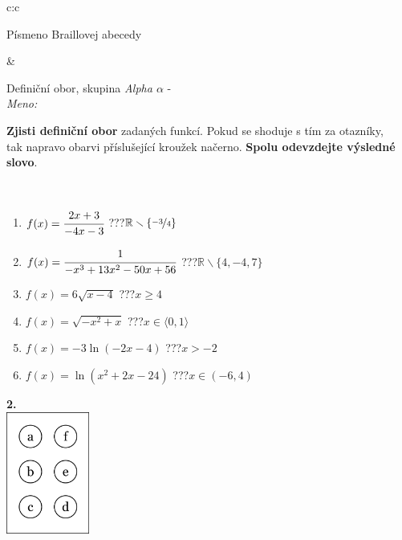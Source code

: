 \documentclass[10pt]{report}
\begin{document}
\begin{tabular}{c:c}
\begin{minipage}[c][104.5mm][t]{0.5\linewidth}
\begin{center}
\begin{minipage}{0.20\linewidth}
\begin{center}
{\small Písmeno Braillovej abecedy}
\end{center}
\end{minipage}
\end{center}
\end{minipage}
&
\begin{minipage}[c][104.5mm][t]{0.5\linewidth}
\begin{center}
\vspace{7mm}
{\huge Definiční obor, skupina \textit{Alpha $\alpha$} -}\\[5mm]
\textit{Meno:}\phantom{xxxxxxxxxxxxxxxxxxxxxxxxxxxxxxxxxxxxxxxxxxxxxxxxxxxxxxxxxxxxxxxxx}\\[5mm]
\begin{minipage}{0.95\linewidth}
\textbf{Zjisti definiční obor} zadaných funkcí. Pokud se shoduje s tím za otazníky,\\tak napravo obarvi příslušející kroužek načerno. \textbf{Spolu odevzdejte výsledné slovo}.
\end{minipage}
\\[1mm]
\begin{minipage}{0.79\linewidth}
\begin{center}
\begin{varwidth}{\linewidth}
\begin{enumerate}
\normalsizerrr
\item $f(x)=\cfrac{2x+3}{-4x-3}$\quad \dotfill\; ???\;\dotfill \quad $\mathbb{R}\smallsetminus\{\nicefrac{-3}{4}\}$
\item $f(x)=\cfrac{1}{-x^3+13x^2-50x+56}$\quad \dotfill\; ???\;\dotfill \quad $\mathbb{R}\smallsetminus\{4,-4,7\}$
\item $f(x)=6\sqrt{x-4}$\quad \dotfill\; ???\;\dotfill \quad $x\geq4$
\item $f(x)=\sqrt{-x^2+x}$\quad \dotfill\; ???\;\dotfill \quad $x\in\langle0 , 1\rangle$
\item $f(x)=-3\ln{(-2x-4)}$\quad \dotfill\; ???\;\dotfill \quad $x>-2$
\item $f(x)=\ln{(x^2+2x-24)}$\quad \dotfill\; ???\;\dotfill \quad $x\in(-6 , 4)$
\end{enumerate}
\end{varwidth}
\end{center}
\end{minipage}
\begin{minipage}{0.20\linewidth}
\begin{center}
{\Huge\bfseries 2.} \\[2mm]
\includegraphics[height=40mm]{../images/braille.png}

\end{center}
\end{minipage}
\end{center}
\end{minipage}
\end{tabular}
\end{document}
